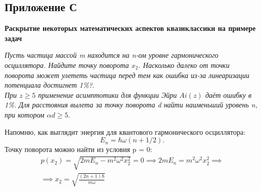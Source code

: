 \setcounter{figure}{0} 
\begin{center}
    \section{Приложение С}\label{appendix:C}
    \textbf{\Large{Раскрытие некоторых математических аспектов квазиклассики на примере задач}}
\end{center}

\begin{center}
\textit{Пусть частица массой m находится на n-ом уровне гармонического осциллятора. Найдите точку поворота $x_2$. Насколько далеко от точки поворота может улететь частица перед тем как ошибка из-за линеаризации потенциала достигнет 1\%?}.\\
\textit{При $z\geq 5$ применение асимптотики для функции Эйри $Ai(z)$ даёт ошибку в 1\%. Для расстояния вылета за точку поворота d найти наименьший уровень n, при котором $\alpha d\geq 5$}.
\end{center}

Напомню, как выглядит энергия для квантового гармонического осциллятора: 
\[E_n = \hbar\omega(n + 1/2).\] Точку поворота можно найти из условия p = 0:
\begin{gather*} 
p(x_2) = \sqrt{2mE_n - m^2\omega^2x_2^2} = 0 \implies 2mE_n = m^2\omega^2x_2^2 \implies \\
\implies x_2 = \sqrt{\frac{(2n + 1)\hbar}{m\omega}}
\end{gather*}

